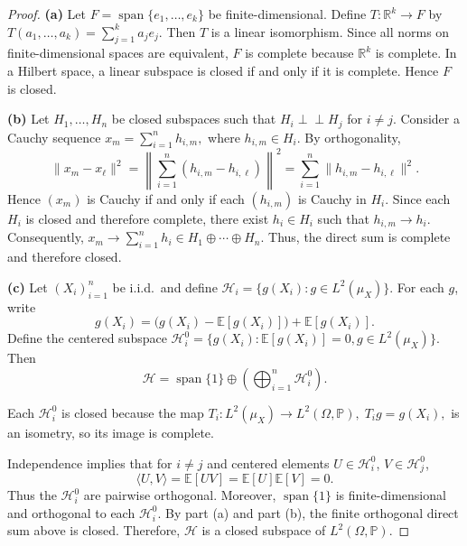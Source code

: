 \documentclass[12pt]{article}
\renewcommand{\(}{\left(}%
\renewcommand{\)}{\right)}%
\renewcommand{\[}{\left[}%
\renewcommand{\]}{\right]}%
\newtheorem{proof}{Proof.}}
\begin{document}
\begin{proof}

\textbf{(a)} Let $F = \operatorname{span}\{e_1,\dots,e_k\}$ be finite-dimensional. Define $T : \mathbb R^k \to F$ by $ T(a_1,\dots,a_k) = \sum_{j=1}^k a_j e_j.$
Then $T$ is a linear isomorphism. Since all norms on finite-dimensional spaces are equivalent, $F$ is complete because $\mathbb R^k$ is complete. In a Hilbert space, a linear subspace is closed if and only if it is complete. Hence $F$ is closed.

\medskip
\noindent
\textbf{(b)} Let $H_1,\dots,H_n$ be closed subspaces such that $H_i \perp\!\!\!\perp H_j$ for $i\neq j$. Consider a Cauchy sequence
$
x_m = \sum_{i=1}^n h_{i,m},
$
where $h_{i,m} \in H_i$. By orthogonality,
\begin{equation*}
\|x_m - x_\ell\|^2
=
\left\|
\sum_{i=1}^n (h_{i,m}-h_{i,\ell})
\right\|^2
=
\sum_{i=1}^n
\|h_{i,m}-h_{i,\ell}\|^2.
\end{equation*}
Hence $(x_m)$ is Cauchy if and only if each $(h_{i,m})$ is Cauchy in $H_i$. Since each $H_i$ is closed and therefore complete, there exist $h_i \in H_i$ such that $h_{i,m}\to h_i$. Consequently,
$
x_m \to \sum_{i=1}^n h_i
\in
H_1 \oplus \cdots \oplus H_n.
$
Thus, the direct sum is complete and therefore closed.

\medskip
\noindent
\textbf{(c)}
Let $(X_i)_{i=1}^n$ be i.i.d.\ and define
$
\mathcal H_i
=
\{ g(X_i) : g \in L^2(\mu_X) \}.
$
For each $g$, write
\begin{equation*}
g(X_i)
=
\big(g(X_i)-\mathbb E[g(X_i)]\big)
+
\mathbb E[g(X_i)].
\end{equation*}
Define the centered subspace
$
\mathcal H_i^0
=
\{ g(X_i) : \mathbb E[g(X_i)] = 0,g \in L^2(\mu_X) \}.
$
Then
\begin{equation*}
\mathcal H
=
\operatorname{span}\{1\}
\oplus
\left(
\bigoplus_{i=1}^n
\mathcal H_i^0
\right).
\end{equation*}

Each $\mathcal H_i^0$ is closed because the map
$
T_i : L^2(\mu_X) \to L^2(\Omega,\mathbb P),
\;
T_i g = g(X_i),
$
is an isometry, so its image is complete.

Independence implies that for $i\neq j$ and centered elements $U\in\mathcal H_i^0$, $V\in\mathcal H_j^0$,
\begin{equation*}
\langle U,V\rangle
=
\mathbb E[UV]
=
\mathbb E[U]\mathbb E[V]
=
0.
\end{equation*}
Thus the $\mathcal H_i^0$ are pairwise orthogonal. Moreover, $\operatorname{span}\{1\}$ is finite-dimensional and orthogonal to each $\mathcal H_i^0$. By part (a) and part (b), the finite orthogonal direct sum above is closed. Therefore,
$
\mathcal H
$
is a closed subspace of $L^2(\Omega,\mathbb P)$.

\end{proof}
  
\end{document}
